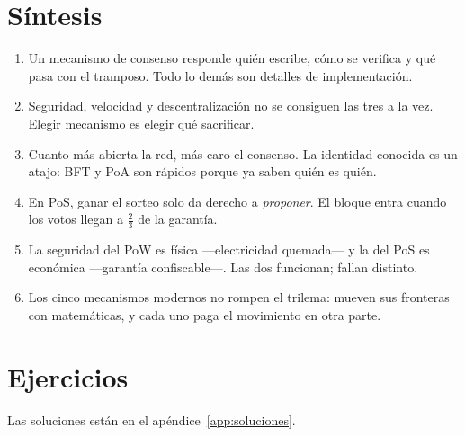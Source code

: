 \documentclass[11pt,a4paper]{article}
\theoremstyle{definition}
\theoremstyle{plain}
\theoremstyle{remark}
\begin{document}
\section{Síntesis}\label{sec:sintesis}

\begin{enumerate}[leftmargin=1.5em]
  \item Un mecanismo de consenso responde quién escribe, cómo se verifica y qué
        pasa con el tramposo. Todo lo demás son detalles de implementación.
  \item Seguridad, velocidad y descentralización no se consiguen las tres a la
        vez. Elegir mecanismo es elegir qué sacrificar.
  \item Cuanto más abierta la red, más caro el consenso. La identidad conocida es
        un atajo: BFT y PoA son rápidos porque ya saben quién es quién.
  \item En PoS, ganar el sorteo solo da derecho a \emph{proponer}. El bloque
        entra cuando los votos llegan a $\frac23$ de la garantía.
  \item La seguridad del PoW es física —electricidad quemada— y la del PoS es
        económica —garantía confiscable—. Las dos funcionan; fallan distinto.
  \item Los cinco mecanismos modernos no rompen el trilema: mueven sus fronteras
        con matemáticas, y cada uno paga el movimiento en otra parte.
\end{enumerate}

\section{Ejercicios}\label{sec:ejercicios}

Las soluciones están en el apéndice~\ref{app:soluciones}.
\end{document}
